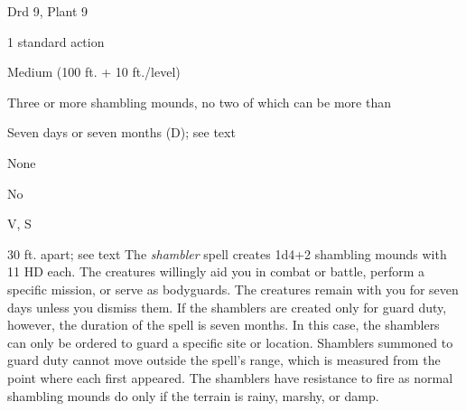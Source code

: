 
\begin{description*}
\item[Level:] Drd 9, Plant 9
\item[Casting Time:] 1 standard action
\item[Range:] Medium (100 ft. + 10 ft./level)
\item[Effect:] Three or more shambling mounds, no two of which can be more than
\item[Duration:] Seven days or seven months (D); see text
\item[Saving Throw:] None
\item[Spell Resistance:] No
\item[Components:] V, S
\end{description*}

30 ft. apart; see text
The \textit{shambler} spell creates 1d4+2 shambling mounds with 11 HD each. The
creatures willingly aid you in combat or battle, perform a specific mission, or
serve as bodyguards. The creatures remain with you for seven days unless you dismiss
them. If the shamblers are created only for guard duty, however, the duration of
the spell is seven months. In this case, the shamblers can only be ordered to guard
a specific site or location. Shamblers summoned to guard duty cannot move outside
the spell's range, which is measured from the point where each first appeared.
The shamblers have resistance to fire as normal shambling mounds do only if the
terrain is rainy, marshy, or damp.